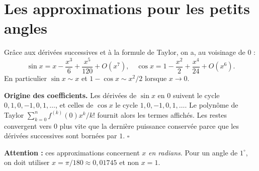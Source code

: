 \documentclass[../cours_spe_trigo.tex]{subfiles}
\begin{document}
\section{Les approximations pour les petits angles}
Grâce aux dérivées successives et à la formule de Taylor, on a, au voisinage de $0$ :
\[
\sin x=x-\frac{x^3}{6}+\frac{x^5}{120}+O(x^7),\quad
\cos x=1-\frac{x^2}{2}+\frac{x^4}{24}+O(x^6).
\]
En particulier $\sin x\sim x$ et $1-\cos x\sim x^2/2$ lorsque $x\to0$.
\begin{demonstration}
\textbf{Origine des coefficients.} Les dérivées de $\sin x$ en $0$ suivent le cycle $0,1,0,-1,0,1,\ldots$, et celles de $\cos x$ le cycle $1,0,-1,0,1,\ldots$. Le polynôme de Taylor $\sum_{k=0}^n f^{(k)}(0)x^k/k!$ fournit alors les termes affichés. Les restes convergent vers $0$ plus vite que la dernière puissance conservée parce que les dérivées successives sont bornées par $1$. $\square$
\end{demonstration}
\textbf{Attention :} ces approximations concernent $x$ \emph{en radians}. Pour un angle de $1^\circ$, on doit utiliser $x=\pi/180\approx0{,}01745$ et non $x=1$.
\end{document}
